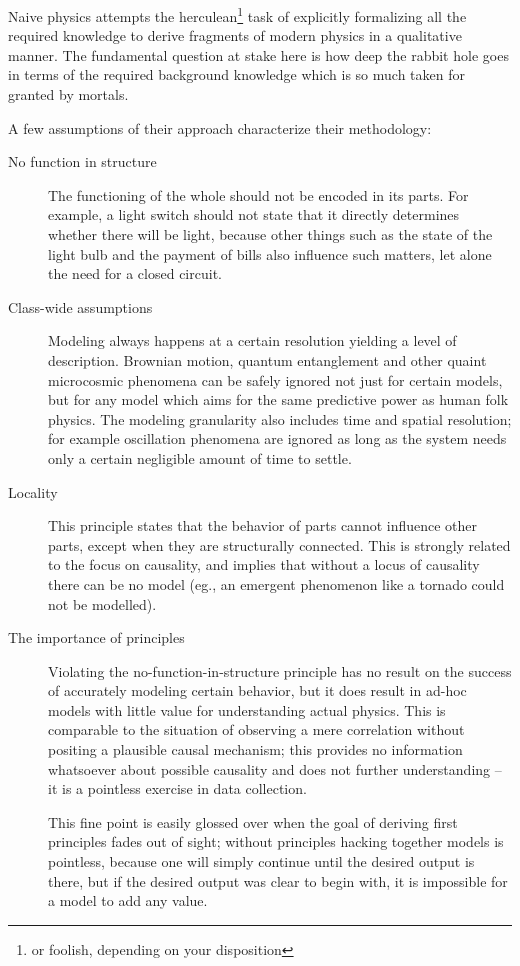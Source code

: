 \documentclass{article} %
\begin{document}
Naive physics attempts the herculean\footnote{or foolish, depending on your
disposition} task of explicitly formalizing all the required knowledge to
derive fragments of modern physics in a qualitative manner. The fundamental
question at stake here is how deep the rabbit hole goes in terms of the
required background knowledge which is so much taken for granted by mortals.

A few assumptions of their approach characterize their methodology:

\begin{description}
	\item[No function in structure]
		The functioning of the whole should not be encoded in its
		parts. For example, a light switch should not state that it
		directly determines whether there will be light, because other
		things such as the state of the light bulb and the payment of
		bills also influence such matters, let alone the need for a
		closed circuit.

	\item[Class-wide assumptions]
		Modeling always happens at a certain resolution yielding a
		level of description. Brownian motion, quantum entanglement
		and other quaint microcosmic phenomena can be safely ignored
		not just for certain models, but for any model which aims for
		the same predictive power as human folk physics. The modeling
		granularity also includes time and spatial resolution; for
		example oscillation phenomena are ignored as long as the system
		needs only a certain negligible amount of time to settle.
	
	\item[Locality]
		This principle states that the behavior of parts cannot
		influence other parts, except when they are structurally
		connected. This is strongly related to the focus on causality,
		and implies that without a locus of causality there can be no
		model (eg., an emergent phenomenon like a tornado could not be
		modelled).

	\item[The importance of principles]
		Violating the no-function-in-structure principle has no result
		on the success of accurately modeling certain behavior, but it
		does result in ad-hoc models with little value for
		understanding actual physics. This is comparable to the
		situation of observing a mere correlation without positing a
		plausible causal mechanism; this provides no information
		whatsoever about possible causality and does not further
		understanding -- it is a pointless exercise in data collection.

		This fine point is easily glossed over when the goal of
		deriving first principles fades out of sight; without
		principles hacking together models is pointless, because one
		will simply continue until the desired output is there, but if
		the desired output was clear to begin with, it is impossible
		for a model to add any value.
\end{description}
\end{document}
